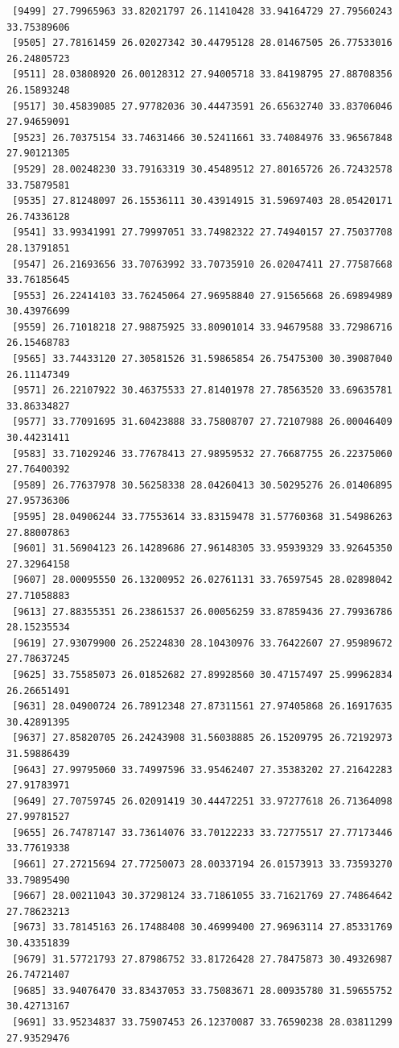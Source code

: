 \documentclass[
  letterpaper,
  DIV=11,
  numbers=noendperiod]{scrartcl}
\begin{document}
\begin{verbatim}
 [9499] 27.79965963 33.82021797 26.11410428 33.94164729 27.79560243 33.75389606
 [9505] 27.78161459 26.02027342 30.44795128 28.01467505 26.77533016 26.24805723
 [9511] 28.03808920 26.00128312 27.94005718 33.84198795 27.88708356 26.15893248
 [9517] 30.45839085 27.97782036 30.44473591 26.65632740 33.83706046 27.94659091
 [9523] 26.70375154 33.74631466 30.52411661 33.74084976 33.96567848 27.90121305
 [9529] 28.00248230 33.79163319 30.45489512 27.80165726 26.72432578 33.75879581
 [9535] 27.81248097 26.15536111 30.43914915 31.59697403 28.05420171 26.74336128
 [9541] 33.99341991 27.79997051 33.74982322 27.74940157 27.75037708 28.13791851
 [9547] 26.21693656 33.70763992 33.70735910 26.02047411 27.77587668 33.76185645
 [9553] 26.22414103 33.76245064 27.96958840 27.91565668 26.69894989 30.43976699
 [9559] 26.71018218 27.98875925 33.80901014 33.94679588 33.72986716 26.15468783
 [9565] 33.74433120 27.30581526 31.59865854 26.75475300 30.39087040 26.11147349
 [9571] 26.22107922 30.46375533 27.81401978 27.78563520 33.69635781 33.86334827
 [9577] 33.77091695 31.60423888 33.75808707 27.72107988 26.00046409 30.44231411
 [9583] 33.71029246 33.77678413 27.98959532 27.76687755 26.22375060 27.76400392
 [9589] 26.77637978 30.56258338 28.04260413 30.50295276 26.01406895 27.95736306
 [9595] 28.04906244 33.77553614 33.83159478 31.57760368 31.54986263 27.88007863
 [9601] 31.56904123 26.14289686 27.96148305 33.95939329 33.92645350 27.32964158
 [9607] 28.00095550 26.13200952 26.02761131 33.76597545 28.02898042 27.71058883
 [9613] 27.88355351 26.23861537 26.00056259 33.87859436 27.79936786 28.15235534
 [9619] 27.93079900 26.25224830 28.10430976 33.76422607 27.95989672 27.78637245
 [9625] 33.75585073 26.01852682 27.89928560 30.47157497 25.99962834 26.26651491
 [9631] 28.04900724 26.78912348 27.87311561 27.97405868 26.16917635 30.42891395
 [9637] 27.85820705 26.24243908 31.56038885 26.15209795 26.72192973 31.59886439
 [9643] 27.99795060 33.74997596 33.95462407 27.35383202 27.21642283 27.91783971
 [9649] 27.70759745 26.02091419 30.44472251 33.97277618 26.71364098 27.99781527
 [9655] 26.74787147 33.73614076 33.70122233 33.72775517 27.77173446 33.77619338
 [9661] 27.27215694 27.77250073 28.00337194 26.01573913 33.73593270 33.79895490
 [9667] 28.00211043 30.37298124 33.71861055 33.71621769 27.74864642 27.78623213
 [9673] 33.78145163 26.17488408 30.46999400 27.96963114 27.85331769 30.43351839
 [9679] 31.57721793 27.87986752 33.81726428 27.78475873 30.49326987 26.74721407
 [9685] 33.94076470 33.83437053 33.75083671 28.00935780 31.59655752 30.42713167
 [9691] 33.95234837 33.75907453 26.12370087 33.76590238 28.03811299 27.93529476

\end{verbatim}
\end{document}
